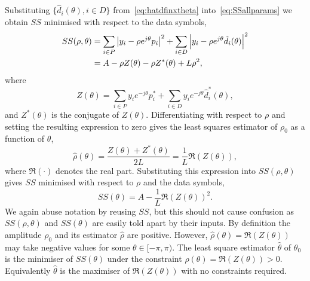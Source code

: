 \documentclass[journal]{IEEEtran}
\begin{document}
Substituting $\{ \hat{d}_i(\theta), i \in D \}$ from~\eqref{eq:hatdfinxtheta} into~\eqref{eq:SSallparams} we obtain $SS$ minimised with respect to the data symbols,
 \begin{align*}
SS(\rho, \theta) &=\sum_{i \in P} {\left\vert  y_i - \rho e^{j\theta} p_i  \right\vert}^2 + \sum_{i \in D} {\left\vert  y_i - \rho e^{j\theta} \hat{d_i}(\theta)  \right\vert}^2 \\
&= A - \rho Z(\theta) - \rho Z^*(\theta) + L \rho^2,
\end{align*}
where
\[
Z(\theta)  = \sum_{i \in P} y_i e^{-j\theta} p_i^* + \sum_{i \in D} y_i e^{-j\theta} \hat{d}_i^*(\theta),
\]
and $Z^*(\theta)$ is the conjugate of $Z(\theta)$.  Differentiating with respect to $\rho$ and setting the resulting expression to zero gives the least squares estimator of $\rho_0$ as a function of $\theta$,
\begin{equation}\label{eq:hatrhoZ}
\hat{\rho}(\theta) = \frac{Z(\theta) + Z^*(\theta)}{2L} = \frac{1}{L}\Re(Z(\theta)),
\end{equation}
where $\Re(\cdot)$ denotes the real part.  %
Substituting this expression into $SS(\rho, \theta)$ gives $SS$ minimised with respect to $\rho$ and the data symbols,
\[
SS(\theta) = A - \frac{1}{L}\Re(Z(\theta))^2.
\]
We again abuse notation by reusing $SS$, but this should not cause confusion as $SS(\rho,\theta)$ and $SS(\theta)$ are easily told apart by their inputs.  By definition the amplitude $\rho_0$ and its estimator $\hat{\rho}$ are positive.  However, $\hat{\rho}(\theta) = \Re(Z(\theta))$ may take negative values for some $\theta \in [-\pi,\pi)$.  %
The least square estimator $\hat{\theta}$ of $\theta_0$ is the minimiser of $SS(\theta)$ under the constraint $\hat{\rho}(\theta) = \Re(Z(\theta)) > 0$.  Equivalently $\hat{\theta}$ is the maximiser of $\Re(Z(\theta))$ with no constraints required.
 
\end{document}
